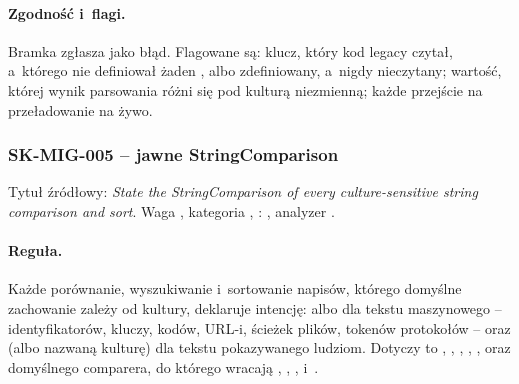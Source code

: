 \paragraph{Zgodność i~flagi.} Bramka zgłasza 
jako błąd. Flagowane są: klucz, który kod legacy czytał, a~którego nie definiował żaden
, albo zdefiniowany, a~nigdy nieczytany; wartość, której wynik
parsowania różni się pod kulturą niezmienną; każde przejście na przeładowanie na żywo.


\subsubsection{SK-MIG-005 -- jawne StringComparison}\label{sec:standardy-sk-mig-005}

Tytuł źródłowy: \emph{State the StringComparison of every culture-sensitive string
comparison and sort}. Waga , kategoria ,
: , analyzer .

\paragraph{Reguła.} Każde porównanie, wyszukiwanie i~sortowanie napisów, którego domyślne
zachowanie zależy od kultury, deklaruje intencję:  albo
 dla tekstu maszynowego -- identyfikatorów, kluczy, kodów, URL-i,
ścieżek plików, tokenów protokołów -- oraz  (albo
nazwaną kulturę) dla tekstu pokazywanego ludziom. Dotyczy to ,
, , ,
,  oraz domyślnego comparera, do
którego wracają , , ,
 i~.

